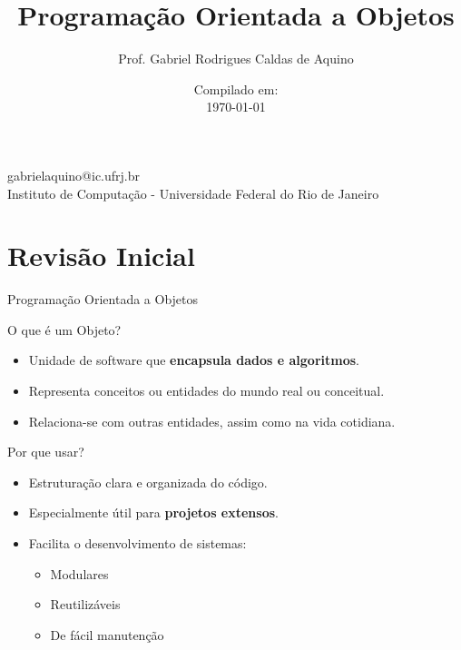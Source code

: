 \title{Programação Orientada a Objetos}

\author{Prof. Gabriel Rodrigues Caldas de Aquino}

\institute
{
    gabrielaquino@ic.ufrj.br\\

    Instituto de Computação -
    Universidade Federal do Rio de Janeiro %
}
\date{Compilado em: \\ \today} %


\section{Revisão Inicial}

\begin{frame}
    \titlepage
\end{frame}

\begin{frame}{Programação Orientada a Objetos}

    \begin{block}{O que é um Objeto?}
        \begin{itemize}
            \item Unidade de software que \textbf{encapsula dados e algoritmos}.
            \item Representa conceitos ou entidades do mundo real ou conceitual.
            \item Relaciona-se com outras entidades, assim como na vida cotidiana.
        \end{itemize}
    \end{block}

    \begin{block}{Por que usar?}
        \begin{itemize}
            \item Estruturação clara e organizada do código.
            \item Especialmente útil para \textbf{projetos extensos}.
            \item Facilita o desenvolvimento de sistemas:
                  \begin{itemize}
                      \item Modulares
                      \item Reutilizáveis
                      \item De fácil manutenção
                  \end{itemize}
        \end{itemize}
    \end{block}

\end{frame}

